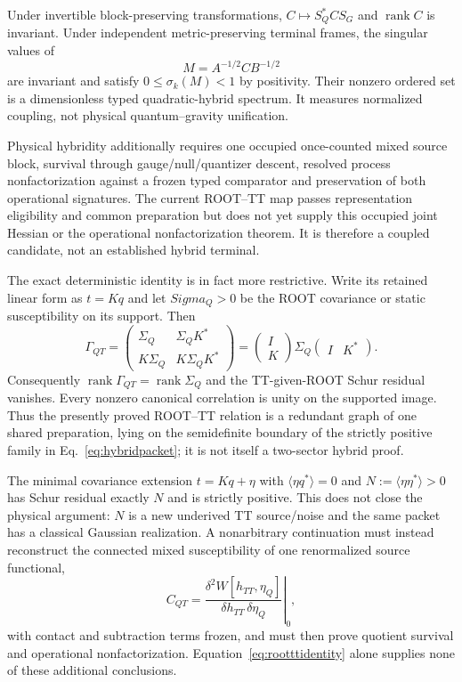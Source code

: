 Under invertible block-preserving transformations,
$C\mapsto S_Q^*CS_G$ and $\operatorname{rank} C$ is invariant. Under independent
metric-preserving terminal frames, the singular values of
\begin{equation}
 M=A^{-1/2}CB^{-1/2}
 \label{eq:hybridspectrum}
\end{equation}
are invariant and satisfy $0\le\sigma_k(M)<1$ by positivity. Their nonzero
ordered set is a dimensionless typed quadratic-hybrid spectrum. It measures
normalized coupling, not physical quantum--gravity unification.

Physical hybridity additionally requires one occupied once-counted mixed
source block, survival through gauge/null/quantizer descent, resolved process
nonfactorization against a frozen typed comparator and preservation of both
operational signatures. The current ROOT--TT map passes representation
eligibility and common preparation but does not yet supply this occupied joint
Hessian or the operational nonfactorization theorem. It is therefore a
coupled candidate, not an established hybrid terminal.

The exact deterministic identity is in fact more restrictive.  Write its
retained linear form as $t=Kq$ and let $Sigma_Q>0$ be the ROOT covariance or
static susceptibility on its support.  Then
\begin{equation}
 \Gamma_{QT}=
 \begin{pmatrix}\Sigma_Q&\Sigma_QK^*\\
 K\Sigma_Q&K\Sigma_QK^*\end{pmatrix}
 =\begin{pmatrix}I\\K\end{pmatrix}\Sigma_Q
 \begin{pmatrix}I&K^*\end{pmatrix}.
 \label{eq:rootttgraphcovariance}
\end{equation}
Consequently $\operatorname{rank}\Gamma_{QT}=\operatorname{rank}\Sigma_Q$
and the TT-given-ROOT Schur residual vanishes.  Every nonzero canonical
correlation is unity on the supported image.  Thus the presently proved
ROOT--TT relation is a redundant graph of one shared preparation, lying on
the semidefinite boundary of the strictly positive family
in Eq.~\eqref{eq:hybridpacket}; it is not itself a two-sector hybrid proof.

The minimal covariance extension $t=Kq+\eta$ with
$\langle\eta q^*\rangle=0$ and $N:=\langle\eta\eta^*\rangle>0$ has Schur
residual exactly $N$ and is strictly positive.  This does not close the
physical argument: $N$ is a new underived TT source/noise and the same packet
has a classical Gaussian realization.  A nonarbitrary continuation must
instead reconstruct the connected mixed susceptibility of one renormalized
source functional,
\begin{equation}
 C_{QT}=\left.
 \frac{\delta^2 W[h_{TT},\eta_Q]}
 {\delta h_{TT}\,\delta\eta_Q}\right|_{0},
 \label{eq:rootttmixedsource}
\end{equation}
with contact and subtraction terms frozen, and must then prove quotient
survival and operational nonfactorization.  Equation~\eqref{eq:rootttidentity}
alone supplies none of these additional conclusions.

